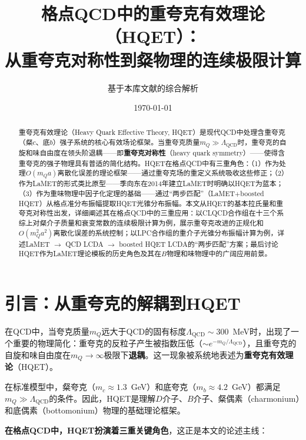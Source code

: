 \documentclass[12pt,a4paper]{ctexart}
\title{\heiti 格点QCD中的重夸克有效理论（HQET）：\\
从重夸克对称性到粲物理的连续极限计算}
\author{基于本库文献的综合解析}
\date{\today}
\theoremstyle{definition}
\begin{document}
\maketitle

\begin{abstract}
\noindent
重夸克有效理论（Heavy Quark Effective Theory, HQET）是现代QCD中处理含重夸克（粲$c$、底$b$）强子系统的核心有效场论框架。当重夸克质量$m_Q \gg \Lambda_{\text{QCD}}$时，重夸克的自旋和味自由度在领头阶退耦——即\textbf{重夸克对称性}（heavy quark symmetry）——使得含重夸克的强子物理具有普适的简化结构。HQET在格点QCD中有三重角色：（1）作为处理$O(m_Q a)$离散化误差的理论框架——通过重夸克场的重定义系统吸收这些修正；（2）作为LaMET的形式类比原型——季向东在2014年建立LaMET时明确以HQET为蓝本；（3）作为重味物理中因子化定理的基础——通过``两步匹配''（LaMET$+$boosted HQET）从格点准分布振幅提取HQET光锥分布振幅。本文从HQET的基本拉氏量和重夸克对称性出发，详细阐述其在格点QCD中的三重应用：以CLQCD合作组在十三个系综上对粲介子质量和衰变常数的连续极限计算为例，展示重夸克改进的正规化和$O(m^2_Q a^2)$离散化误差的系统控制；以LPC合作组的重介子光锥分布振幅计算为例，详述LaMET $\to$ QCD LCDA $\to$ boosted HQET LCDA的``两步匹配''方案；最后讨论HQET作为LaMET理论模板的历史角色及其在$B$物理和味物理中的广阔应用前景。
\end{abstract}

\tableofcontents
\newpage

\section{引言：从重夸克的解耦到HQET}

在QCD中，当夸克质量$m_Q$远大于QCD的固有标度$\Lambda_{\text{QCD}} \sim 300$~MeV时，出现了一个重要的物理简化：重夸克的反粒子产生被指数压低（$\sim e^{-m_Q/\Lambda_{\text{QCD}}}$），且重夸克的自旋和味自由度在$m_Q \to \infty$极限下\textbf{退耦}。这一现象被系统地表述为\textbf{重夸克有效理论}（HQET）。

在标准模型中，粲夸克（$m_c \approx 1.3$~GeV）和底夸克（$m_b \approx 4.2$~GeV）都满足$m_Q \gg \Lambda_{\text{QCD}}$的条件。因此，HQET是理解$D$介子、$B$介子、粲偶素（charmonium）和底偶素（bottomonium）物理的基础理论框架。

\textbf{在格点QCD中，HQET扮演着三重关键角色}，这正是本文的论述主线：
\end{document}
